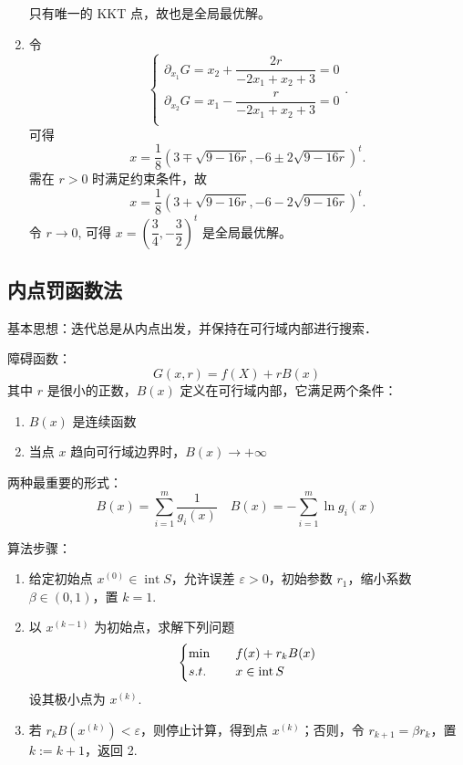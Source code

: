 \begin{example}
\begin{enumerate}
        只有唯一的 KKT 点，故也是全局最优解。
        \item 令 
        \[
            \begin{cases}
                \partial_{x_1}G = x_2 + \dfrac{2r}{-2x_1 + x_2 + 3} = 0\\
                \partial_{x_2}G = x_1 - \dfrac{r}{-2x_1 + x_2 + 3} = 0\\
            \end{cases}.
        \] 
        可得 
        \[
            x = \frac{1}{8}(3 \mp \sqrt{9 - 16r}, -6 \pm 2\sqrt{9 - 16r})^t.
        \] 
        需在 $r > 0$ 时满足约束条件，故 
        \[
            x = \frac{1}{8}(3 + \sqrt{9 - 16r}, -6 - 2\sqrt{9 - 16r})^t.
        \] 
        令 $r \to 0$, 可得 $x = \left(\dfrac{3}{4}, -\dfrac{3}{2}\right)^t$ 是全局最优解。
    \end{enumerate}
\end{example}

\subsection{内点罚函数法}
基本思想：迭代总是从内点出发，并保持在可行域内部进行搜索．

\begin{note}
    障碍函数：\[G(x, r) = f(X) + rB(x)\]
    其中 $r$ 是很小的正数，$B(x)$ 定义在可行域内部，它满足两个条件：\begin{enumerate}
        \item $B(x)$ 是连续函数
        \item 当点 $x$ 趋向可行域边界时，$B(x) \to +\infty$
    \end{enumerate}
    两种最重要的形式：\[B(x) = \sum_{i = 1}^m \frac{1}{g_i(x)} \quad B(x) = -\sum_{i = 1}^m\ln g_i(x)\]
\end{note}

\begin{note}
    算法步骤：\begin{enumerate}
        \item 给定初始点 $x^{(0)} \in \operatorname{int} S$，允许误差 $\varepsilon > 0$，初始参数 $r_1$，缩小系数 $\beta\in (0, 1)$，置 $k=1$.
        \item 以 $x^{(k - 1)}$ 为初始点，求解下列问题\[\begin{cases}
            \min \quad &f(x) + r_kB(x)\\
            s.t. \quad &x \in \operatorname{int} S
        \end{cases}\] 设其极小点为 $x^{(k)}$.
        \item 若 $r_kB(x^{(k)}) < \varepsilon$，则停止计算，得到点 $x^{(k)}$；否则，令 $r_{k + 1} = \beta r_k$，置 $k := k + 1$，返回 2.
    \end{enumerate}
\end{note}

